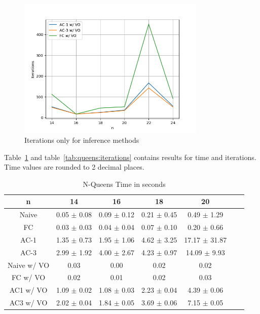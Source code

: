 \begin{figure}[ht]
	\centering
	\includegraphics[width=0.8\textwidth]{./Problems/queens/plots/iterations_inference.png}
	\caption{Iterations only for inference methods}
	\label{fig:queens:iterations_inference}
\end{figure}

Table~\ref{tab:queens:time} and table~\ref{tab:queens:iterations} contains results for time and iterations. Time values are rounded to 2 decimal places.

\begin{table}[h!]
	\centering
	\begin{tabular}{|c|c|c|c|c|c|c|}
		\hline
		n           & 14              & 16              & 18              & 20                \\ \hline
		Naive       & 0.05 $\pm$ 0.08 & 0.09 $\pm$ 0.12 & 0.21 $\pm$ 0.45 & 0.49 $\pm$ 1.29   \\ \hline
		FC          & 0.03 $\pm$ 0.03 & 0.04 $\pm$ 0.04 & 0.07 $\pm$ 0.10 & 0.20 $\pm$ 0.66   \\ \hline
		AC-1        & 1.35 $\pm$ 0.73 & 1.95 $\pm$ 1.06 & 4.62 $\pm$ 3.25 & 17.17 $\pm$ 31.87 \\ \hline
		AC-3        & 2.99 $\pm$ 1.92 & 4.00 $\pm$ 2.67 & 4.23 $\pm$ 0.97 & 14.09 $\pm$ 9.93  \\ \hline
		Naive w/ VO & 0.03            & 0.00            & 0.02            & 0.02              \\ \hline
		FC w/ VO    & 0.02            & 0.01            & 0.02            & 0.03              \\ \hline
		AC1 w/ VO   & 1.09 $\pm$ 0.02 & 1.08 $\pm$ 0.03 & 2.23 $\pm$ 0.04 & 4.39 $\pm$ 0.06   \\ \hline
		AC3 w/ VO   & 2.02 $\pm$ 0.04 & 1.84 $\pm$ 0.05 & 3.69 $\pm$ 0.06 & 7.15 $\pm$ 0.05   \\ \hline
	\end{tabular}
	\caption{N-Queens Time in seconds}
	\label{tab:queens:time}
\end{table}

